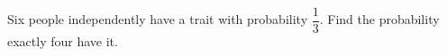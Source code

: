 Six people independently have a trait with probability $\dfrac{1}{3}$. Find the probability exactly four have it.
